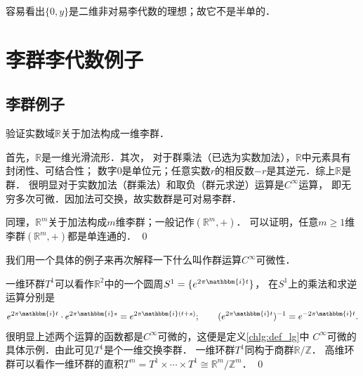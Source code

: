 容易看出$\{0, y\}$是二维非对易李代数的理想；故它不是半单的．




\section{李群李代数例子}\label{chlg:sec_example}


\subsection{李群例子}
\begin{example}\label{chlg:exam_Rplus}
    验证实数域$\mathbb{R}$关于加法构成一维李群．
    
    首先，$\mathbb{R}$是一维光滑流形．其次，
    对于群乘法（已选为实数加法），$\mathbb{R}$中元素具有封闭性、可结合性；
    数字$0$是单位元；任意实数$r$的相反数$-r$是其逆元．综上$\mathbb{R}$是群．
    很明显对于实数加法（群乘法）和取负（群元求逆）运算是$C^\infty$运算，
    即无穷多次可微．因加法可交换，故实数群是可对易李群．
    
    同理，$\mathbb{R}^m$关于加法构成$m$维李群；一般记作$(\mathbb{R}^m,+)$． 
    可以证明，任意$m \geqslant 1$维李群$(\mathbb{R}^m,+)$都是{\kaishu 单连通}的． \qed
\end{example}


我们用一个具体的例子来再次解释一下什么叫作群运算$C^\infty$可微性．
\begin{example}\label{chlg:exam_1loopT}
    一维环群$T^1$可以看作$\mathbb{R}^2$中的一个圆周$S^1=\{e^{2\pi \mathbbm{i}t} \}$，
    在$S^1$上的乘法和求逆运算分别是
    \begin{align*}
        e^{2\pi \mathbbm{i}t} \cdot e^{2\pi \mathbbm{i}s} = e^{2\pi \mathbbm{i}(t+s)}; \qquad
        (e^{2\pi \mathbbm{i}t})^{-1} = e^{-2\pi \mathbbm{i}t} .
    \end{align*}
    很明显上述两个运算的函数都是$C^\infty$可微的，这便是定义\ref{chlg:def_lg}中
    $C^\infty$可微的具体示例．由此可见$T^1$是个一维交换李群．
    一维环群$T^1$同构于商群$\mathbb{R}/\mathbb{Z}$． %
    高维环群可以看作一维环群的直积$T^m=T^1\times \cdots \times T^1 \cong \mathbb{R}^m/\mathbb{Z}^m$．
    \qed
\end{example}

